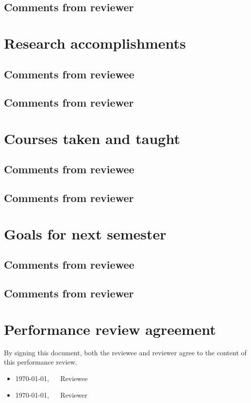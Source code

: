 \documentclass[10pt]{article}
\begin{document}
\subsection*{Comments from reviewer}

\section*{Research accomplishments}
\subsection*{Comments from reviewee}

\subsection*{Comments from reviewer}

\section*{Courses taken and taught}
\subsection*{Comments from reviewee}

\subsection*{Comments from reviewer}

\section*{Goals for next semester}
\subsection*{Comments from reviewee}

\subsection*{Comments from reviewer}

\section*{Performance review agreement}
By signing this document, both the reviewee and reviewer agree to the
content of this performance review.
\vspace{3mm}
\begin{itemize}[]
 \setlength\itemsep{3mm}
 \item \today, ~~ Reviewee
 \item \today, ~~ Reviewer
\end{itemize}
\end{document}
